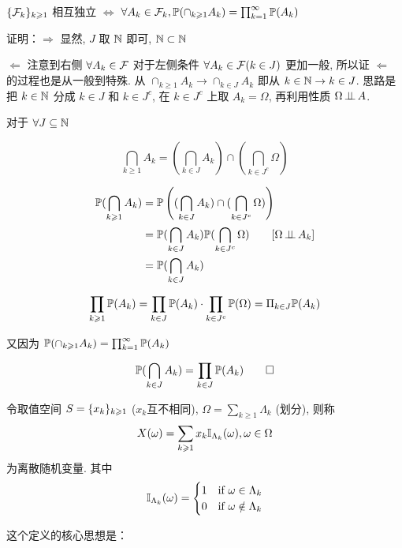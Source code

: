 \begin{property}\label{prop:equiv_sigma_mutual_indep}
    $\{{\mathcal{F}}_{k}\}_{k \geqslant 1}$ 相互独立 $\Leftrightarrow$ $\forall A_k\in \mathcal{F}_k, \mathbb{P}(\cap_{k\geqslant 1}A_k)=\prod_{k=1}^{\infty}\mathbb{P}(A_k)$
\end{property}

证明：$\Rightarrow$ 显然, $J$ 取 $\mathbb{N}$ 即可, $\mathbb{N}\subset \mathbb{N}$

$\Leftarrow$ 注意到右侧 $\forall A_k\in \mathcal{F}$ 对于左侧条件 $\forall A_k\in \mathcal{F}(k\in J)$ 更加一般, 所以证 $\Leftarrow$ 的过程也是从一般到特殊. 从 $\cap_{k\geq 1}A_k\rightarrow \cap_{k\in J}A_k$ 即从 $k\in\mathbb{N}\rightarrow k\in J$. 思路是把 $k\in\mathbb{N}$ 分成 $k\in J$ 和 $k\in J^c$, 在 $k\in J^c$ 上取 $A_k=\Omega$, 再利用性质 $\Omega\operatorname{\perp\!\!\!\perp} A$. 

对于 $\forall J\subseteq \mathbb{N}$

\[
\bigcap_{k\geq 1}A_k=\left(\bigcap_{k\in J}A_k\right)\cap \left(\bigcap_{k\in J^c}\Omega\right)
\]

\[
\begin{aligned}
    \mathbb{P}(\bigcap_{k\geqslant 1}A_k) &=\mathbb{P}\left((\bigcap_{k\in J}A_k)\cap (\bigcap_{k\in J^c}\Omega)\right)\\
    &=\mathbb{P}(\bigcap_{k\in J}A_k)\mathbb{P}(\bigcap_{k\in J^c}\Omega)\qquad [\Omega\operatorname{\perp\!\!\!\perp} A_k]\\
    &=\mathbb{P}(\bigcap_{k\in J}A_k)
\end{aligned}
\]

\[
\prod_{k\geqslant 1}\mathbb{P}(A_k)=\prod_{k\in J}\mathbb{P}(A_k)\cdot \prod_{k\in J^c}\mathbb{P}(\Omega)=\Pi_{k\in J}\mathbb{P}(A_k)
\]

又因为 $\mathbb{P}(\cap_{k\geqslant 1}A_k)=\prod_{k=1}^{\infty}\mathbb{P}(A_k)$

\[
\mathbb{P}(\bigcap_{k\in J}A_k)=\prod_{k\in J}\mathbb{P}(A_k)\qed
\]

\begin{definition}[离散随机变量]\label{def:discrete_rv}
    令取值空间 $S=\{{x}_{k}\}_{k \geqslant 1}$ ($x_k$互不相同), $\Omega=\sum_{k\geq 1}\Lambda_k$ (划分), 则称 
\begin{equation}
X(\omega)=\sum_{k\geqslant 1}x_k\mathbb I_{\Lambda_k}(\omega), \omega\in \Omega
\label{eq:def_drv}
\end{equation}
为离散随机变量. 其中
\[
\mathbb I_{\Lambda_k}(\omega)=\begin{cases}
        1 & \text{if }\omega\in \Lambda_k\\
        0 & \text{if }\omega\notin \Lambda_k
\end{cases}
\]
\end{definition}

这个定义的核心思想是：

